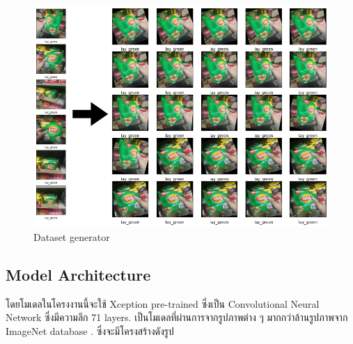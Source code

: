 \begin{figure}[h]
  \begin{center}

    \includegraphics[scale=0.4]{pic/model/lay_genmore.png}
  \end{center}

  \caption[Dataset generator]{Dataset generator}
  \label{fig:Dataset generator}
\end{figure}




\newpage
\subsection{Model Architecture}
โดยโมเดลในโครงงานนี้จะใช้ Xception pre-trained ซึ่งเป็น Convolutional Neural Network ซึ่งมีความลึก 71 layers.
เป็นโมเดลที่ผ่านการจากรูปภาพต่าง ๆ มากกว่าล้านรูปภาพจาก ImageNet database .
ซึ่งจะมีโครงสร้างดังรูป


